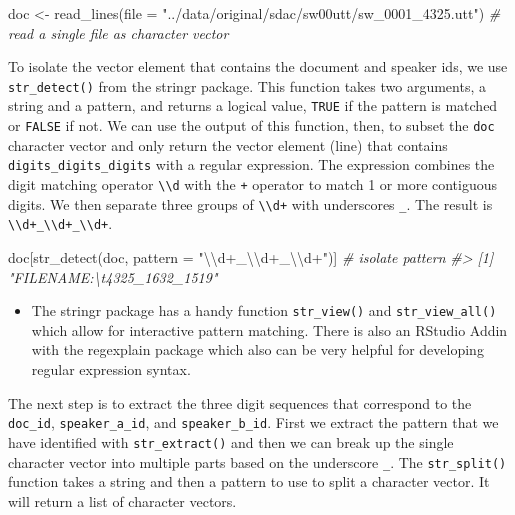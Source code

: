 \documentclass[
]{article}
\newenvironment{Shaded}{\begin{snugshade}}{\end{snugshade}}
\newcommand{\AttributeTok}[1]{\textcolor[rgb]{0.77,0.63,0.00}{#1}}
\newcommand{\CommentTok}[1]{\textcolor[rgb]{0.56,0.35,0.01}{\textit{#1}}}
\newcommand{\FunctionTok}[1]{\textcolor[rgb]{0.00,0.00,0.00}{#1}}
\newcommand{\NormalTok}[1]{#1}
\newcommand{\OtherTok}[1]{\textcolor[rgb]{0.56,0.35,0.01}{#1}}
\newcommand{\SpecialCharTok}[1]{\textcolor[rgb]{0.00,0.00,0.00}{#1}}
\newcommand{\StringTok}[1]{\textcolor[rgb]{0.31,0.60,0.02}{#1}}
\newenvironment{rmdblock}[1]
  {\begin{shaded*}
  \begin{itemize}
  \renewcommand{\labelitemi}{
    \raisebox{-.5\height}[0pt][0pt]{
      {\setkeys{Gin}{width=2em,keepaspectratio}\texttt{[image: assets/images/\#1]}}
    }
  }
  \item
  }
  {
  \end{itemize}
  \end{shaded*}
  }
\newenvironment{rmdtip}
  {\begin{rmdblock}{tip}}
  {\end{rmdblock}}
\begin{document}
\begin{Shaded}
\begin{Highlighting}[]
\NormalTok{doc }\OtherTok{\textless{}{-}} \FunctionTok{read\_lines}\NormalTok{(}\AttributeTok{file =} \StringTok{"../data/original/sdac/sw00utt/sw\_0001\_4325.utt"}\NormalTok{)  }\CommentTok{\# read a single file as character vector}
\end{Highlighting}
\end{Shaded}

To isolate the vector element that contains the document and speaker ids, we use \texttt{str\_detect()} from the stringr package. This function takes two arguments, a string and a pattern, and returns a logical value, \texttt{TRUE} if the pattern is matched or \texttt{FALSE} if not. We can use the output of this function, then, to subset the \texttt{doc} character vector and only return the vector element (line) that contains \texttt{digits\_digits\_digits} with a regular expression. The expression combines the digit matching operator \texttt{\textbackslash{}\textbackslash{}d} with the \texttt{+} operator to match 1 or more contiguous digits. We then separate three groups of \texttt{\textbackslash{}\textbackslash{}d+} with underscores \texttt{\_}. The result is \texttt{\textbackslash{}\textbackslash{}d+\_\textbackslash{}\textbackslash{}d+\_\textbackslash{}\textbackslash{}d+}.

\begin{Shaded}
\begin{Highlighting}[]
\NormalTok{doc[}\FunctionTok{str\_detect}\NormalTok{(doc, }\AttributeTok{pattern =} \StringTok{"}\SpecialCharTok{\textbackslash{}\textbackslash{}}\StringTok{d+\_}\SpecialCharTok{\textbackslash{}\textbackslash{}}\StringTok{d+\_}\SpecialCharTok{\textbackslash{}\textbackslash{}}\StringTok{d+"}\NormalTok{)]  }\CommentTok{\# isolate pattern}
\CommentTok{\#\textgreater{} [1] "FILENAME:\textbackslash{}t4325\_1632\_1519"}
\end{Highlighting}
\end{Shaded}

\begin{rmdtip}
The stringr package has a handy function \texttt{str\_view()} and
\texttt{str\_view\_all()} which allow for interactive pattern matching.
There is also an RStudio Addin with the regexplain package which also
can be very helpful for developing regular expression syntax.
\end{rmdtip}

The next step is to extract the three digit sequences that correspond to the \texttt{doc\_id}, \texttt{speaker\_a\_id}, and \texttt{speaker\_b\_id}. First we extract the pattern that we have identified with \texttt{str\_extract()} and then we can break up the single character vector into multiple parts based on the underscore \texttt{\_}. The \texttt{str\_split()} function takes a string and then a pattern to use to split a character vector. It will return a list of character vectors.
\end{document}
